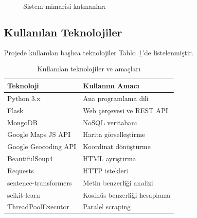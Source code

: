\documentclass[conference]{IEEEtran}
\begin{document}
\begin{figure}[H]
    \centering
    \caption{Sistem mimarisi katmanları}
    \label{fig:mimari}
\end{figure}

\subsection{Kullanılan Teknolojiler}

Projede kullanılan başlıca teknolojiler Tablo~\ref{tab:teknolojiler}'de listelenmiştir.

\begin{table}[H]
    \centering
    \caption{Kullanılan teknolojiler ve amaçları}
    \label{tab:teknolojiler}
    \begin{tabular}{|l|l|}
        \hline
        \textbf{Teknoloji} & \textbf{Kullanım Amacı} \\
        \hline
        Python 3.x & Ana programlama dili \\
        Flask & Web çerçevesi ve REST API \\
        MongoDB & NoSQL veritabanı \\
        Google Maps JS API & Harita görselleştirme \\
        Google Geocoding API & Koordinat dönüştürme \\
        BeautifulSoup4 & HTML ayrıştırma \\
        Requests & HTTP istekleri \\
        sentence-transformers & Metin benzerliği analizi \\
        scikit-learn & Kosinüs benzerliği hesaplama \\
        ThreadPoolExecutor & Paralel scraping \\
        \hline
    \end{tabular}
\end{table}
\end{document}
